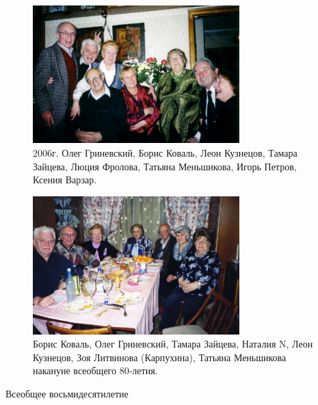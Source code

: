 \begin{figure}[h!]
    \includegraphics[width=80mm]{inc/18/2}
    
    \caption{2006г. Олег Гриневский, Борис Коваль, Леон Кузнецов, Тамара Зайцева, Люция Фролова, Татьяна Меньшикова, Игорь Петров, Ксения Варзар.}
\end{figure}

\begin{figure}[h!]
    \includegraphics[width=80mm]{inc/18/3}
    
    \caption{Борис Коваль, Олег Гриневский, Тамара Зайцева, Наталия N, Леон Кузнецов, Зоя Литвинова (Карпухина), Татьяна Меньшикова накануне всеобщего 80-летия.}
\end{figure}

\newpage

\begin{center}
Всеобщее восьмидесятилетие
\end{center}

